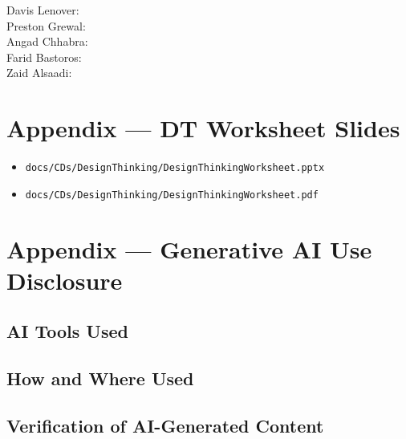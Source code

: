 \documentclass[12pt]{article}
\begin{document}
\begin{description}
  \item[Davis Lenover:] \todo{}
  \item[Preston Grewal:] \todo{}
  \item[Angad Chhabra:] \todo{}
  \item[Farid Bastoros:] \todo{}
  \item[Zaid Alsaadi:] \todo{}
\end{description}

\newpage
\appendix

\section{Appendix --- DT Worksheet Slides} \label{SecWorksheets}


\begin{itemize}
  \item \texttt{docs/CDs/DesignThinking/DesignThinkingWorksheet.pptx}
  \item \texttt{docs/CDs/DesignThinking/DesignThinkingWorksheet.pdf}
\end{itemize}

\section{Appendix --- Generative AI Use Disclosure} \label{SecAI}


\subsection{AI Tools Used}
\subsection{How and Where Used}
\subsection{Verification of AI-Generated Content}
\end{document}
